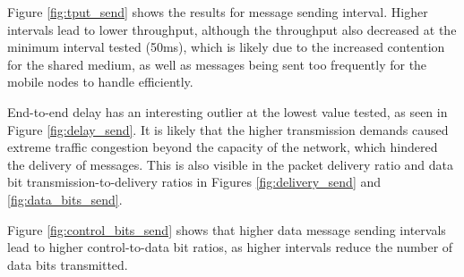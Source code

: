 \documentclass{winslabreport}
\begin{document}
Figure \ref{fig:tput_send} shows the results for message sending interval. Higher intervals lead to lower throughput, although the throughput also decreased at the minimum interval tested (50ms), which is likely due to the increased contention for the shared medium, as well as messages being sent too frequently for the mobile nodes to handle efficiently.

End-to-end delay has an interesting outlier at the lowest value tested, as seen in Figure \ref{fig:delay_send}. It is likely that the higher transmission demands caused extreme traffic congestion beyond the capacity of the network, which hindered the delivery of messages. This is also visible in the packet delivery ratio and data bit transmission-to-delivery ratios in Figures \ref{fig:delivery_send} and \ref{fig:data_bits_send}.

Figure \ref{fig:control_bits_send} shows that higher data message sending intervals lead to higher control-to-data bit ratios, as higher intervals reduce the number of data bits transmitted.
\end{document}
